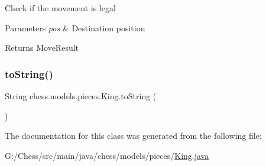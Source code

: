 Check if the movement is legal 
\begin{DoxyParams}{Parameters}
{\em pos} & Destination position \\
\hline
\end{DoxyParams}
\begin{DoxyReturn}{Returns}
Move\+Result 
\end{DoxyReturn}
\mbox{\label{classchess_1_1models_1_1pieces_1_1_king_ae287258d6c093ce7d7c3196f7dde6d99}} 
\subsubsection{\texorpdfstring{to\+String()}{toString()}}
{\footnotesize\ttfamily String chess.\+models.\+pieces.\+King.\+to\+String (\begin{DoxyParamCaption}{ }\end{DoxyParamCaption})}



The documentation for this class was generated from the following file\+:\begin{DoxyCompactItemize}
\item 
G\+:/\+Chess/src/main/java/chess/models/pieces/\mbox{\hyperlink{_king_8java}{King.\+java}}\end{DoxyCompactItemize}
